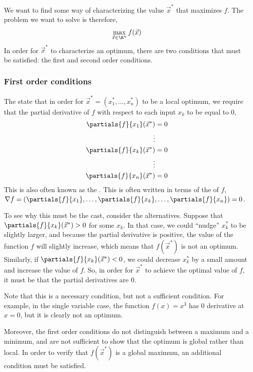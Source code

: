 We want to find some way of characterizing the value $\vec{x}^*$ that maximizes $f$. The problem we want to solve is therefore,
\begin{align*}
    \max_{\vec{x} \in \R^n} f(\vec{x})
\end{align*}
In order for $\vec{x}^*$ to characterize an optimum, there are two conditions that must be satisfied: the first and second order conditions. 

\subsubsection*{First order conditions}
The  state that in order for $\vec{x}^* = (x_1^*, \dots, x_n^*)$ to be a local optimum, we require that the partial derivative of $f$ with respect to each input $x_k$ to be equal to 0, 
\begin{align*}
    \partials{f}{x_1}(\vec{x}^*) &= 0 \\
    \vdots \\
    \partials{f}{x_k}(\vec{x}^*) &= 0 \\
    \vdots \\
    \partials{f}{x_n}(\vec{x}^*) &= 0
\end{align*}
This is also often known as the . This is often written in terms of the  of $f$, $\nabla f = (\partials{f}{x_1}, \dots, \partials{f}{x_k}, \dots, \partials{f}{x_n}) = 0$.

To see why this must be the cast, consider the alternatives. Suppose that $\partials{f}{x_k}(\vec{x}^*) > 0$ for some $x_k$. In that case, we could ``nudge'' $x_k^*$ to be slightly larger, and because the partial derivative is positive, the value of the function $f$ will slightly increase, which means that $f(\vec{x}^*)$ is not an optimum. Similarly, if $\partials{f}{x_k}(\vec{x}^*) < 0$, we could decrease $x_k^*$ by a small amount and increase the value of $f$. So, in order for $\vec{x}^*$ to achieve the optimal value of $f$, it must be that the partial derivatives are 0. 

Note that this is a necessary condition, but not a sufficient condition. For example, in the single variable case, the function $f(x) = x^3$ has 0 derivative at $x = 0$, but it is clearly not an optimum. 


Moreover, the first order conditions do not distinguish between a maximum and a minimum, and are not sufficient to show that the optimum is global rather than local. In order to verify that $f(\vec{x}^*)$ is a global maximum, an additional condition must be satisfied. 

